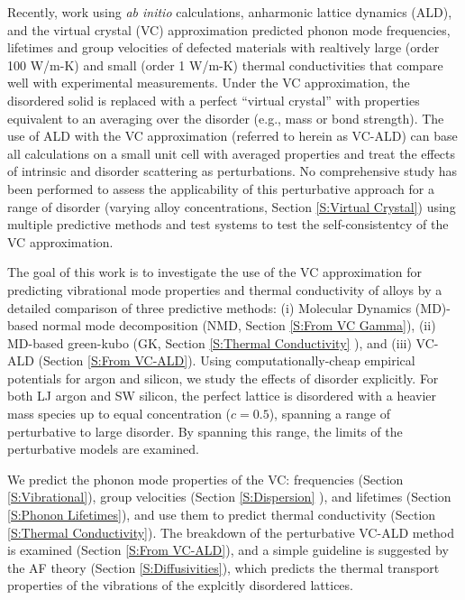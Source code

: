 \documentclass[aps,prb,onecolumn,preprint,superscriptaddress,amsmath,amssymb,floatfix]{revtex4}
\begin{document}
Recently, work using \emph{ab initio} calculations, anharmonic 
lattice dynamics (ALD), and the virtual crystal (VC) 
approximation predicted phonon mode frequencies, lifetimes and 
group velocities of defected materials with realtively
large (order 100 W/m-K\cite{garg_role_2011,lindsay_thermal_2012}) 
and 
small (order 1 W/m-K\cite{tian_phonon_2012}) 
thermal conductivities that compare well with experimental 
measurements. 
Under the VC approximation, the disordered 
solid is replaced with a perfect “virtual crystal” with properties 
equivalent to an averaging over the disorder (e.g., mass or bond 
strength).\cite{abeles_lattice_1963}
The use of ALD with the VC approximation 
(referred to herein as VC-ALD) can base  
all calculations on a small unit cell with averaged properties and 
treat the effects of intrinsic and disorder scattering as perturbations.
\cite{abeles_lattice_1963,tamura_isotope_1983,
tian_phonon_2012,lindsay_thermal_2012} 
No comprehensive study has been performed 
to assess the applicability of this perturbative approach for a range 
of disorder (varying alloy concentrations, Section 
\ref{S:Virtual Crystal}) 
using multiple predictive methods and test systems to test 
the self-consistentcy of the VC approximation. 

The goal of this work is to investigate the use of the VC 
approximation for predicting vibrational mode properties and 
thermal conductivity of alloys by a detailed comparison 
of three predictive methods: (i) Molecular Dynamics (MD)-based 
normal mode 
decomposition (NMD, Section \ref{S:From VC Gamma}), 
(ii) MD-based green-kubo (GK, Section \ref{S:Thermal Conductivity} ), 
and (iii) VC-ALD (Section \ref{S:From VC-ALD}). 
Using computationally-cheap empirical potentials for argon
\cite{ashcroft_solid_1976} 
and silicon\cite{stillinger_computer_1985},  
we study the effects of disorder explicitly.
For both LJ argon and SW silicon, the perfect lattice is 
disordered with a heavier mass species up to equal 
concentration ($c=0.5$), spanning 
a range of perturbative to large disorder. By spanning this range, 
the limits of the perturbative models are examined.

We predict 
the phonon mode properties of the VC:  
frequencies (Section \ref{S:Vibrational}), 
group velocities (Section \ref{S:Dispersion} ),  
and lifetimes (Section \ref{S:Phonon Lifetimes}), 
and use them to predict thermal
conductivity (Section \ref{S:Thermal Conductivity}). 
The breakdown of the perturbative VC-ALD method is examined 
(Section \ref{S:From VC-ALD}), 
and a simple guideline is suggested by  
the AF theory (Section \ref{S:Diffusivities}), which predicts 
the thermal transport properties of the vibrations of the 
explcitly disordered lattices.
\end{document}
